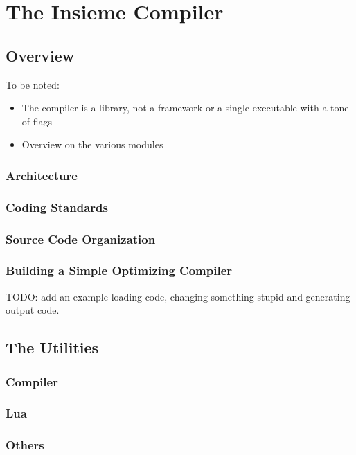\chapter{The Insieme Compiler} \label{cap:compiler}

\section{Overview}

To be noted:
\begin{itemize}
  \item The compiler is a library, not a framework or a single executable with a
  tone of flags
  \item Overview on the various modules
\end{itemize}

\subsection{Architecture}
\subsection{Coding Standards}
\subsection{Source Code Organization}
\subsection{Building a Simple Optimizing Compiler}
\label{cap:compiler:sec:overview:sub:building} TODO: add an example loading
code, changing something stupid and generating output code.

\section{The Utilities}
 

\subsection{Compiler}
\subsection{Lua}
\subsection{Others}
